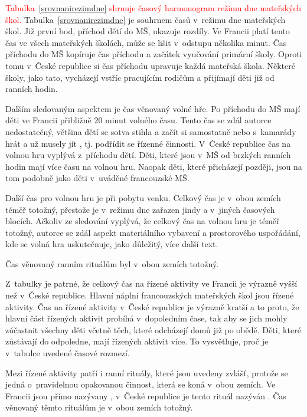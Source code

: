 	\textcolor{red}{Tabulka~\ref{srovnanirezimdne} shrnuje časový harmonogram režimu dne mateřských škol.}
	Tabulka~\ref{srovnanirezimdne} je souhrnem časů v~režimu dne mateřských škol. Již první bod, příchod dětí do MŠ, ukazuje rozdíly. Ve Francii platí tento čas ve všech mateřských školách, může se lišit v~odstupu několika minut. Čas příchodu do MŠ kopíruje čas příchodu a začátek vyučování primární školy. Oproti tomu v~České republice si čas příchodu upravuje každá mateřská škola. Některé školy, jako tato, vycházejí vstříc pracujícím rodičům a přijímají děti již od ranních hodin.

	Dalším sledovaným aspektem je čas věnovaný volné hře. Po příchodu do MŠ mají děti ve Francii přibližně 20 minut volného času. Tento čas se zdál autorce nedostatečný, většina dětí se sotva stihla  a začít si samostatně nebo s~kamarády hrát a už musely jít , tj. podřídit se řízenné činnosti. V~České republice čas na volnou hru vyplývá z~příchodu dětí. Děti, které jsou v~MŠ od brzkých ranních hodin mají více času na volnou hru. Naopak děti, které přicházejí později, jsou na tom podobně jako děti v~uváděné francouzské MŠ. 

	Další čas pro volnou hru je při pobytu venku. Celkový čas je v~obou zemích téměř totožný, přestože je v~režimu dne zařazen jindy a v~jiných časových blocích. Ačkoliv ze sledování vyplývá, že celkový čas na volnou hru je téměř totožný, autorce se zdál aspekt materiálního vybavení a prostorového uspořádání, kde se volná hra uskutečnuje, jako důležitý, více další text.

	Čas věnovaný ranním rituálům byl v~obou zemích totožný. 

	Z~tabulky je patrné, že celkový čas na řízené aktivity ve Francii je výrazně vyšší než v~České republice. Hlavní náplní francouzských mateřských škol jsou řízené aktivity. Čas na řízené aktivity v~České republice je výrazně kratší a to proto, že hlavní část řízených aktivit probíhá v~dopoledním čase, tak aby se jich mohly zúčastnit všechny děti včetně těch, které odcházejí domů již po obědě. Děti, které zůstávají do odpoledne, mají řízených aktivit více. To vysvětluje, proč je v~tabulce uvedené časové rozmezí.

	Mezi řízené aktivity patří i ranní rituály, které jsou uvedeny zvlášť, protože se jedná o~pravidelnou opakovanou činnost, která se koná v~obou zemích. Ve Francii jsou přímo nazývany , v~České republice je tento rituál nazýván . Čas věnovaný těmto rituálům je v~obou zemích totožný.


